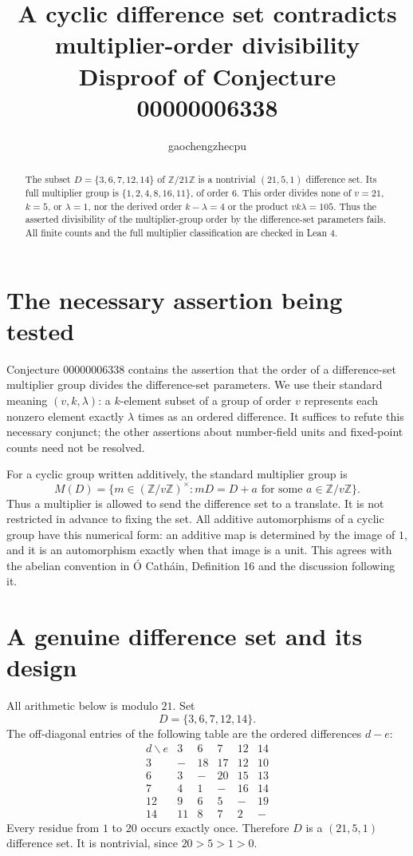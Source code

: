 \documentclass[11pt]{article}
\title{A cyclic difference set contradicts\\multiplier-order divisibility\\
\large Disproof of Conjecture 00000006338}
\author{gaochengzhecpu}\date{}
\newcommand{\Z}{\mathbb Z}
\begin{document}
\maketitle
\begin{abstract}
The subset $D=\{3,6,7,12,14\}$ of $\Z/21\Z$ is a nontrivial
$(21,5,1)$ difference set. Its full multiplier group is
$\{1,2,4,8,16,11\}$, of order $6$. This order divides none of
$v=21$, $k=5$, or $\lambda=1$, nor the derived order $k-\lambda=4$
or the product $vk\lambda=105$. Thus the asserted divisibility of the
multiplier-group order by the difference-set parameters fails.
All finite counts and the full multiplier classification are checked in Lean 4.
\end{abstract}

\section*{The necessary assertion being tested}
Conjecture 00000006338 contains the assertion that the order of a
difference-set multiplier group divides the difference-set parameters.
We use their standard meaning $(v,k,\lambda)$: a $k$-element subset
of a group of order $v$ represents each nonzero element exactly
$\lambda$ times as an ordered difference.
It suffices to refute this necessary conjunct; the other assertions
about number-field units and fixed-point counts need not be resolved.

For a cyclic group written additively, the standard multiplier group is
\[
 M(D)=\{m\in(\Z/v\Z)^\times:
          mD=D+a\text{ for some }a\in\Z/v\Z\}.
\]
Thus a multiplier is allowed to send the difference set to a translate.
It is not restricted in advance to fixing the set. All additive
automorphisms of a cyclic group have this numerical form: an additive
map is determined by the image of $1$, and it is an automorphism exactly
when that image is a unit. This agrees with the abelian convention in
\'{O} Cath\'{a}in, Definition 16 and the discussion following it.

\section*{A genuine difference set and its design}
All arithmetic below is modulo $21$. Set
\[
       D=\{3,6,7,12,14\}.
\]
The off-diagonal entries of the following table are the ordered
differences $d-e$:
\[
\begin{array}{c|rrrrr}
 d\backslash e&3&6&7&12&14\\\hline
 3 & -&18&17&12&10\\
 6 & 3&-&20&15&13\\
 7 & 4&1&-&16&14\\
12 & 9&6&5&-&19\\
14 &11&8&7&2&-
\end{array}
\]
Every residue from $1$ to $20$ occurs exactly once. Therefore $D$ is
a $(21,5,1)$ difference set. It is nontrivial, since $20>5>1>0$.
\end{document}
